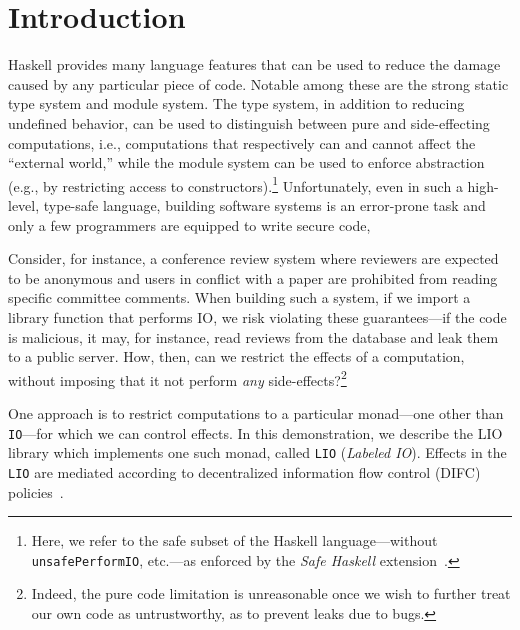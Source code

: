 \section{Introduction}
\label{sec:intro}

Haskell provides many language features that can be used to reduce the
damage caused by any particular piece of code.
%
Notable among these are the strong static type system and module
system.
%
The type system, in addition to reducing undefined behavior, can be
used to distinguish between pure and side-effecting computations,
i.e., computations that respectively can and cannot affect the
``external world,'' while the module system can be used to enforce
abstraction (e.g., by restricting access to constructors).\footnote{
  Here, we refer to the safe subset of the Haskell language---without
  \texttt{unsafePerformIO}, etc.---as enforced by
  the \emph{Safe Haskell} extension~\cite{safehaskell}.
}
%
Unfortunately, even in such a high-level, type-safe language, building
software systems is an error-prone task and only a few programmers are
equipped to write secure code,
 
Consider, for instance, a conference review system where reviewers are
expected to be anonymous and users in conflict with a paper are
prohibited from reading specific committee comments.
%
When building such a system, if we import a library function that
performs IO, we risk violating these guarantees---if the code is
malicious, it may, for instance, read reviews from the database and
leak them to a public server.
%
How, then, can we restrict the effects of a computation, without
imposing that it not perform \emph{any} side-effects?\footnote{
  Indeed, the pure code limitation is unreasonable once we wish to
  further treat our own code as untrustworthy, as to prevent leaks due
  to bugs.
}

One approach is to restrict computations to a particular monad---one
other than \texttt{IO}---for which we can control effects.
%
In this demonstration, we describe the LIO library which implements
one such monad, called \texttt{LIO} (\emph{Labeled IO}).
%
Effects in the \texttt{LIO} are mediated according to decentralized
information flow control (DIFC) policies~\cite{myers:dlm,
sabelfeld:language-based-iflow}.

